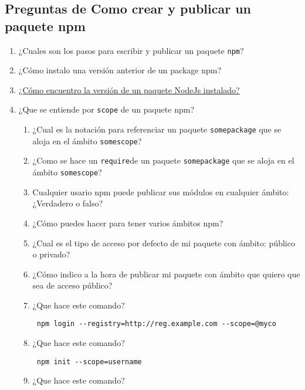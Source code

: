 \subsection{Preguntas de Como crear y publicar un paquete
npm}\label{preguntas-de-como-crear-y-publicar-un-paquete-npm}

\begin{enumerate}
\def\labelenumi{\arabic{enumi}.}
\item
  ¿Cuales son los pasos para escribir y publicar un paquete
  \texttt{npm}?
\item
  ¿Cómo instalo una versión anterior de un package npm? 
\item
  \href{http://stackoverflow.com/questions/10972176/find-the-version-of-an-installed-npm-package}{¿Cómo
  encuentro la versión de un paquete NodeJs instalado?}
\item
  ¿Que se entiende por \texttt{scope} de un paquete npm?

  \begin{enumerate}
  \def\labelenumii{\arabic{enumii}.}
  \item
    ¿Cual es la notación para referenciar un paquete
    \texttt{somepackage} que se aloja en el ámbito \texttt{somescope}?
  \item
    ¿Como se hace un \texttt{require}de un paquete \texttt{somepackage}
    que se aloja en el ámbito \texttt{somescope}?
  \item
    Cualquier usario npm puede publicar sus módulos en cualquier ámbito:
    ¿Verdadero o falso?
  \item
    ¿Cómo puedes hacer para tener varios ámbitos npm?
  \item
    ¿Cual es el tipo de acceso por defecto de mi paquete con ámbito:
    público o privado? 
  \item
    ¿Cómo indico a la hora de publicar mi paquete con ámbito que quiero
    que sea de acceso público? 
  \item
    ¿Que hace este comando?

\begin{verbatim}
 npm login --registry=http://reg.example.com --scope=@myco
\end{verbatim}
  \item
    ¿Que hace este comando?

\begin{verbatim}
 npm init --scope=username
\end{verbatim}
  \item
    ¿Que hace este comando?


\end{enumerate}
\end{enumerate}

